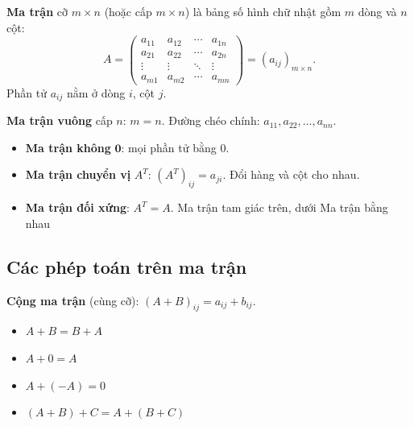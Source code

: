\documentclass[12pt,a4paper]{article}
\begin{document}
\begin{dinhnghia}
  \textbf{Ma trận} cỡ $m \times n$ (hoặc cấp $m \times n$) là bảng số hình chữ nhật gồm $m$ dòng và $n$ cột:
  \[
    A = \begin{pmatrix}
      a_{11} & a_{12} & \cdots & a_{1n} \\
      a_{21} & a_{22} & \cdots & a_{2n} \\
      \vdots & \vdots & \ddots & \vdots \\
      a_{m1} & a_{m2} & \cdots & a_{mn}
    \end{pmatrix} = (a_{ij})_{m \times n}.
  \]
  Phần tử $a_{ij}$ nằm ở dòng $i$, cột $j$.
\end{dinhnghia}

\begin{dinhnghia}
  \textbf{Ma trận vuông} cấp $n$: $m = n$. Đường chéo chính: $a_{11}, a_{22}, \ldots, a_{nn}$.
\end{dinhnghia}

\begin{tinhchat}[title={Các loại ma trận đặc biệt}]
  \begin{itemize}
    \item \textbf{Ma trận không} $\mathbf{0}$: mọi phần tử bằng 0.
    \item \textbf{Ma trận chuyển vị} $A^T$: $(A^T)_{ij} = a_{ji}$. Đổi hàng và cột cho nhau.
    \item \textbf{Ma trận đối xứng}: $A^T = A$.
    Ma trận tam giác trên, dưới
    Ma trận bằng nhau
  \end{itemize}
\end{tinhchat}

\subsection{Các phép toán trên ma trận}

\begin{dinhnghia}
  \textbf{Cộng ma trận} (cùng cỡ): $(A + B)_{ij} = a_{ij} + b_{ij}$.
\end{dinhnghia}

\begin{tinhchat}
  \begin{itemize}
    \item $A + B = B + A$
    \item $A + 0 = A$
    \item $A + (-A) = 0$
    \item $(A + B) + C = A + (B + C)$
  \end{itemize}
\end{tinhchat}
\end{document}
